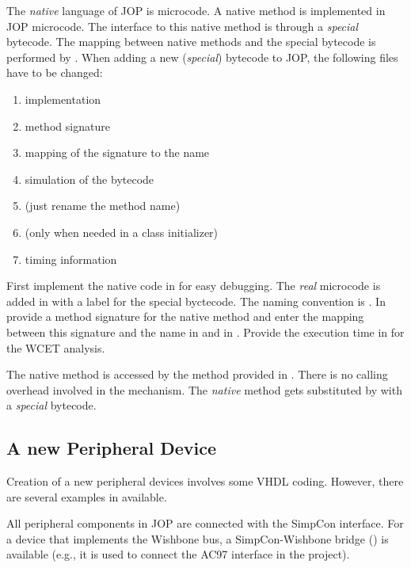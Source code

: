  The \emph{native} language of JOP is microcode.
A native method is implemented in JOP microcode. The interface to
this native method is through a \emph{special} bytecode. The mapping
between native methods and the special bytecode is performed by
. When adding a new (\emph{special}) bytecode to JOP,
the following files have to be changed:
\begin{enumerate}
    \item {} implementation
    \item {} method signature
    \item {} mapping of the signature to the name
    \item {} simulation of the bytecode
    \item {} (just rename the method name)
    \item {} (only when needed in a class
        initializer)
    \item {} timing information
\end{enumerate}

First implement the native code in  for easy
debugging. The \emph{real} microcode is added in  with
a label for the special byctecode. The naming convention is
. In  provide a method
signature for the native method and enter the mapping between this
signature and the name in  and in
. Provide the execution time in
 for the WCET analysis.

The native method is accessed by the method provided in
. There is no calling overhead involved in the
mechanism. The \emph{native} method gets substituted by
 with a \emph{special} bytecode.

\subsection{A new Peripheral Device}

Creation of a new peripheral devices involves some VHDL coding.
However, there are several examples in 
available.

All peripheral components in JOP are connected with the SimpCon
\cite{simpcon} interface. For a device that implements the Wishbone
\cite{soc:wishbone} bus, a SimpCon-Wishbone bridge ()
is available (e.g., it is used to connect the AC97 interface in the
 project).

